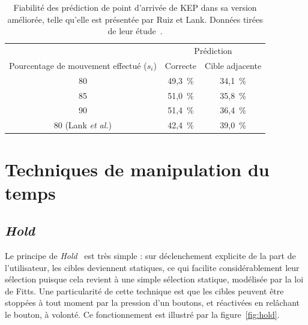\begin{appendices}
	\begin{table}
	\centering
	\begin{tabular}{c | c c}
														& \multicolumn{2}{c}{Prédiction}	\\
		Pourcentage de mouvement effectué ($s_{i}$)	& Correcte	& Cible adjacente	\bigstrut[b] \\ \hline
		80												& 49,3~\%{}	& 34,1~\%{}			\bigstrut[t] \\
		85												& 51,0~\%{}	& 35,8~\%{}			\\
		90												& 51,4~\%{}	& 36,4~\%{}			\\
		80 (Lank \emph{et al.})							& 42,4~\%{}	& 39,0~\%{}			\\
	\end{tabular}
	\caption[KEP stable -- fiabilité des prédictions]{Fiabilité des prédiction de point d'arrivée de KEP dans sa version améliorée, telle qu'elle est présentée par Ruiz et Lank. Données tirées de leur étude~\cite{ruiz2009effects}.}
	\label{tab:kepStable}
	\end{table}












\section{Techniques de manipulation du temps}

	\subsection{\emph{Hold}}
	\label{sub:hold}
	Le principe de \emph{Hold}~\cite{hajri2011moving} est très simple : sur déclenchement explicite de la part de l'utilisateur, les cibles deviennent statiques, ce qui facilite considérablement leur sélection puisque cela revient à une simple sélection statique, modélisée par la loi de Fitts. Une particularité de cette technique est que les cibles peuvent être stoppées à tout moment par la pression d'un boutons, et \og réactivées \fg{} en relâchant le bouton, à volonté. Ce fonctionnement est illustré par la figure~\ref{fig:hold}.
	

\end{appendices}
